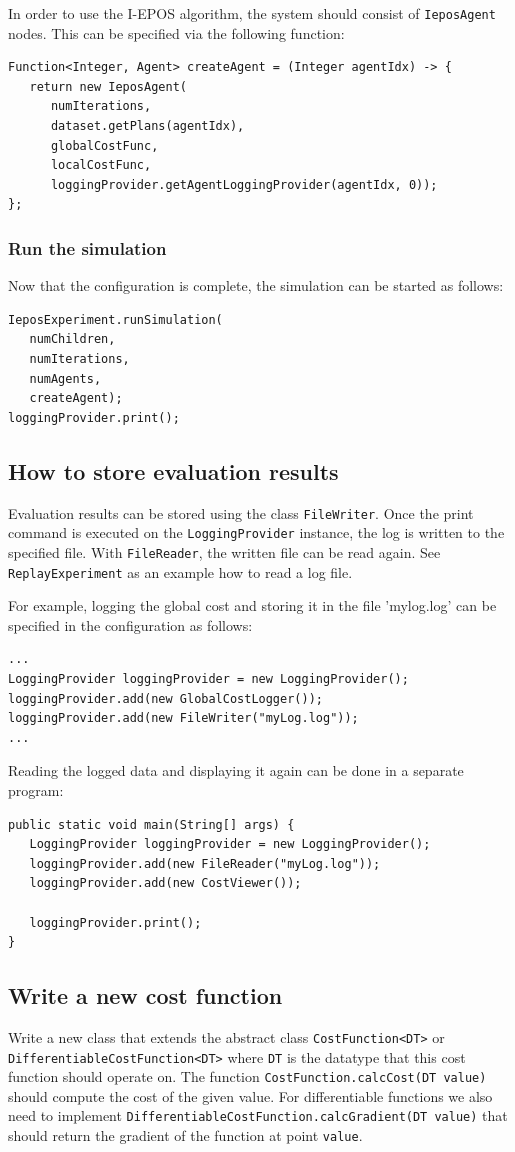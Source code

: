 \documentclass[11pt]{article} %
\newcommand{\code}{\texttt}
\begin{document}
\noindent In order to use the I-EPOS algorithm, the system should consist of \code{IeposAgent} nodes. This can be specified via the following function:
\begin{verbatim}
Function<Integer, Agent> createAgent = (Integer agentIdx) -> {
   return new IeposAgent(
      numIterations,
      dataset.getPlans(agentIdx),
      globalCostFunc,
      localCostFunc,
      loggingProvider.getAgentLoggingProvider(agentIdx, 0));
};
\end{verbatim}

\subsubsection*{Run the simulation}
Now that the configuration is complete, the simulation can be started as follows:
\begin{verbatim}
IeposExperiment.runSimulation(
   numChildren,
   numIterations,
   numAgents,
   createAgent);
loggingProvider.print();
\end{verbatim}

\subsection{How to store evaluation results} \label{sec:store_results}
Evaluation results can be stored using the class \code{FileWriter}. Once the print command is executed on the \code{LoggingProvider} instance, the log is written to the specified file. With \code{FileReader}, the written file can be read again. See \code{ReplayExperiment} as an example how to read a log file.

For example, logging the global cost and storing it in the file 'mylog.log' can be specified in the configuration as follows:
\begin{verbatim}
...
LoggingProvider loggingProvider = new LoggingProvider();
loggingProvider.add(new GlobalCostLogger());
loggingProvider.add(new FileWriter("myLog.log"));
...
\end{verbatim}
Reading the logged data and displaying it again can be done in a separate program:
\begin{verbatim}
public static void main(String[] args) {
   LoggingProvider loggingProvider = new LoggingProvider();
   loggingProvider.add(new FileReader("myLog.log"));
   loggingProvider.add(new CostViewer());

   loggingProvider.print();
}
\end{verbatim}

\subsection{Write a new cost function} \label{sec:new_func}
Write a new class that extends the abstract class \code{CostFunction<DT>} or\\\code{DifferentiableCostFunction<DT>} where \code{DT} is the datatype that this cost function should operate on. The function \code{CostFunction.calcCost(DT value)} should compute the cost of the given value. For differentiable functions we also need to implement \code{DifferentiableCostFunction.calcGradient(DT value)} that should return the gradient of the function at point \code{value}.
\end{document}
